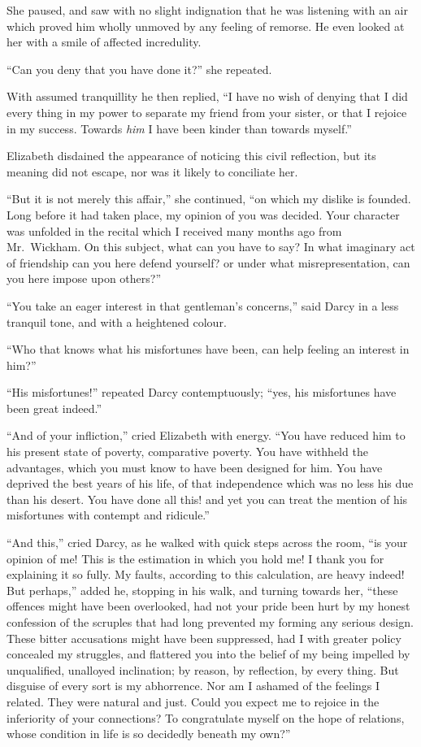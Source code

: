 She paused, and saw with no slight indignation that
he was listening with an air which proved him wholly
unmoved by any feeling of remorse. He even looked at
her with a smile of affected incredulity.

“Can you deny that you have done it?” she repeated.

With assumed tranquillity he then replied, “I have no wish
of denying that I did every thing in my power to separate
my friend from your sister, or that I rejoice in my success.
Towards \textit{him} I have been kinder than towards myself.”

Elizabeth disdained the appearance of noticing this civil
reflection, but its meaning did not escape, nor was it
likely to conciliate her.

“But it is not merely this affair,” she continued, “on
which my dislike is founded. Long before it had taken
place, my opinion of you was decided. Your character
was unfolded in the recital which I received many months
ago from Mr.\ Wickham. On this subject, what can you
have to say? In what imaginary act of friendship can you
here defend yourself? or under what misrepresentation,
can you here impose upon others?”

“You take an eager interest in that gentleman’s
concerns,” said Darcy in a less tranquil tone, and with
a heightened colour.

“Who that knows what his misfortunes have been, can
help feeling an interest in him?”

“His misfortunes!” repeated Darcy contemptuously;
“yes, his misfortunes have been great indeed.”

“And of your infliction,” cried Elizabeth with energy.
“You have reduced him to his present state of poverty,
comparative poverty. You have withheld the advantages,
which you must know to have been designed for him.
You have deprived the best years of his life, of that
independence which was no less his due than his desert. You
have done all this! and yet you can treat the mention
of his misfortunes with contempt and ridicule.”

“And this,” cried Darcy, as he walked with quick
steps across the room, “is your opinion of me! This is
the estimation in which you hold me! I thank you
for explaining it so fully. My faults, according to this
calculation, are heavy indeed! But perhaps,” added he,
stopping in his walk, and turning towards her, “these
offences might have been overlooked, had not your pride
been hurt by my honest confession of the scruples that
had long prevented my forming any serious design.
These bitter accusations might have been suppressed, had
I with greater policy concealed my struggles, and flattered
you into the belief of my being impelled by unqualified,
unalloyed inclination; by reason, by reflection, by
every thing. But disguise of every sort is my abhorrence.
Nor am I ashamed of the feelings I related. They
were natural and just. Could you expect me to rejoice
in the inferiority of your connections? To congratulate
myself on the hope of relations, whose condition in life
is so decidedly beneath my own?”


